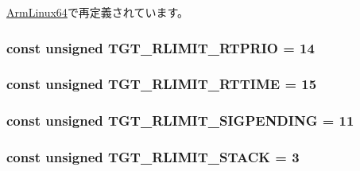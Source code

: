 \hyperlink{classArmLinux64_a599454267926920de3bd5a488bda3e03af8c89e70a7d4ff9e8854599d3a168529}{ArmLinux64}で再定義されています。\hypertarget{classLinux_ab7db6b4a69a3034ee6799727a6e0181c}{
\subsubsection[{TGT\_\-RLIMIT\_\-RTPRIO}]{\setlength{\rightskip}{0pt plus 5cm}const unsigned {\bf TGT\_\-RLIMIT\_\-RTPRIO} = 14}}
\label{classLinux_ab7db6b4a69a3034ee6799727a6e0181c}
\hypertarget{classLinux_a7d1f3330f2489be24c06fd967c6c3938}{
\subsubsection[{TGT\_\-RLIMIT\_\-RTTIME}]{\setlength{\rightskip}{0pt plus 5cm}const unsigned {\bf TGT\_\-RLIMIT\_\-RTTIME} = 15}}
\label{classLinux_a7d1f3330f2489be24c06fd967c6c3938}
\hypertarget{classLinux_ac21355dd5e59b445cb99e98fcb2b96ba}{
\subsubsection[{TGT\_\-RLIMIT\_\-SIGPENDING}]{\setlength{\rightskip}{0pt plus 5cm}const unsigned {\bf TGT\_\-RLIMIT\_\-SIGPENDING} = 11}}
\label{classLinux_ac21355dd5e59b445cb99e98fcb2b96ba}
\hypertarget{classLinux_ab251873bf0e7cec0ff214e53b11045ea}{
\subsubsection[{TGT\_\-RLIMIT\_\-STACK}]{\setlength{\rightskip}{0pt plus 5cm}const unsigned {\bf TGT\_\-RLIMIT\_\-STACK} = 3}}
\label{classLinux_ab251873bf0e7cec0ff214e53b11045ea}


